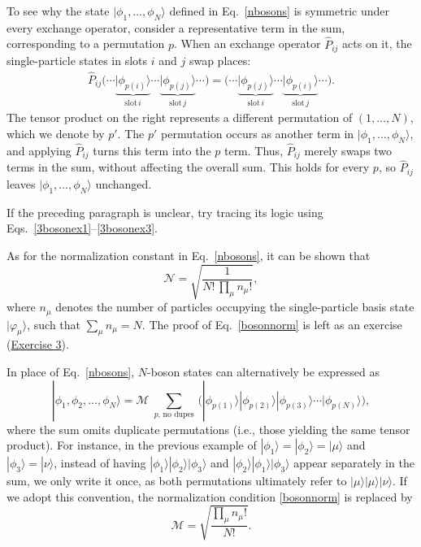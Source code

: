 \documentclass[prx,12pt]{revtex4-2}
\begin{document}
To see why the state $|\phi_1,\dots,\phi_N\rangle$ defined in
Eq.~\eqref{nbosons} is symmetric under every exchange operator,
consider a representative term in the sum, corresponding to a
permutation $p$.  When an exchange operator $\hat{P}_{ij}$ acts on it,
the single-particle states in slots $i$ and $j$ swap places:
\begin{align}
  \hat{P}_{ij} \Big(\cdots  \underbrace{|\phi_{p(i)}\rangle}_{\mathrm{slot}\,i}  \cdots  \underbrace{|\phi_{p(j)}\rangle}_{\mathrm{slot}\,j}\cdots\Big) = \Big(\cdots  \underbrace{|\phi_{p(j)}\rangle}_{\mathrm{slot}\,i}  \cdots  \underbrace{|\phi_{p(i)}\rangle}_{\mathrm{slot}\,j}\cdots\Big).
\label{pboson}
\end{align}
The tensor product on the right represents a different permutation of
$(1, \dots, N)$, which we denote by $p'$.  The $p'$ permutation occurs
as another term in $|\phi_1,\dots,\phi_N\rangle$, and applying
$\hat{P}_{ij}$ turns this term into the $p$ term.  Thus,
$\hat{P}_{ij}$ merely swaps two terms in the sum, without affecting
the overall sum.  This holds for every $p$, so $\hat{P}_{ij}$ leaves
$|\phi_1,\dots,\phi_N\rangle$ unchanged.

If the preceding paragraph is unclear, try tracing its logic using
Eqs.~\eqref{3bosonex1}--\eqref{3bosonex3}.

As for the normalization constant in Eq.~\eqref{nbosons}, it can be
shown that
\begin{equation}
  \mathcal{N} = \sqrt{\frac{1}{N!\, \prod_\mu n_\mu!}},
  \label{bosonnorm}
\end{equation}
where $n_\mu$ denotes the number of particles occupying the
single-particle basis state $|\varphi_\mu\rangle$, such that $\sum_\mu
n_\mu = N$.  The proof of Eq.~\eqref{bosonnorm} is left as an exercise
(\hyperref[ex:boson_norm]{Exercise 3}).

In place of Eq.~\eqref{nbosons}, $N$-boson states can alternatively be
expressed as
\begin{equation}
  |\phi_1,\phi_2,\dots,\phi_N\rangle = \mathcal{M} \; \sum_{p,\,\textrm{no dupes}}\,
  \Big(|\phi_{p(1)}\rangle  |\phi_{p(2)}\rangle  |\phi_{p(3)}\rangle  \cdots
  |\phi_{p(N)}\rangle\Big),
  \label{nbosons2}
\end{equation}
where the sum omits duplicate permutations (i.e., those yielding the
same tensor product).  For instance, in the previous example of
$|\phi_1\rangle = |\phi_2\rangle = |\mu\rangle$ and $|\phi_3\rangle =
|\nu\rangle$, instead of having $|\phi_1 \rangle |\phi_2 \rangle
|\phi_3 \rangle$ and $|\phi_2 \rangle |\phi_1 \rangle |\phi_3 \rangle$
appear separately in the sum, we only write it once, as both
permutations ultimately refer to $|\mu \rangle |\mu \rangle |\nu
\rangle$.  If we adopt this convention, the normalization condition
\eqref{bosonnorm} is replaced by
\begin{equation}
  \mathcal{M} = \sqrt{\frac{\prod_\mu n_\mu!}{N!}}.
\end{equation}
\end{document}
